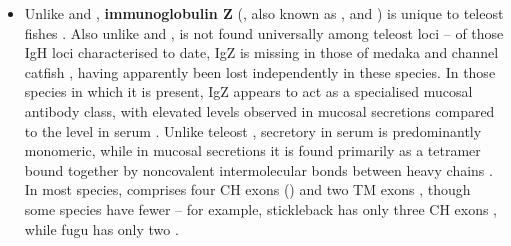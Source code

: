 \begin{itemize}
\item Unlike  and , \textbf{immunoglobulin Z} (, also known as ,  and ) is unique to teleost fishes \parencite{fillatreau2013astonishing}. Also unlike  and ,  is not found universally among teleost loci -- of those IgH loci characterised to date, IgZ is missing in those of medaka and channel catfish \parencite{fillatreau2013astonishing,magadan2011medaka}, having apparently been lost independently in these species. In those species in which it is present, IgZ appears to act as a specialised mucosal antibody class, with elevated levels observed in mucosal secretions compared to the level in serum \parencite{zhang2010igtgut,fillatreau2013astonishing,xu2013igtskin}. Unlike teleost , secretory  in serum is predominantly monomeric, while in mucosal secretions it is found primarily as a tetramer bound together by noncovalent intermolecular bonds between heavy chains \parencite{zhang2010igtgut}. In most species,  comprises four CH exons () and two TM exons \parencite{mashoof2016immunoglobulins}, though some species have fewer -- for example, stickleback  has only three CH exons \parencite{bao2010stickleback,gambondeza2011stickleback}, while fugu  has only two \parencite{fillatreau2013astonishing,savan2005fugu}.
\end{itemize}

